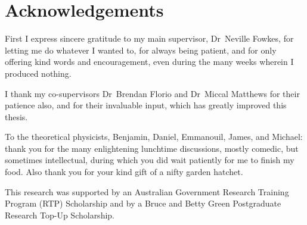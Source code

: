 \chapter{Acknowledgements}
\label{ch:acknowledgements}

First I express sincere gratitude to my main supervisor,
Dr~Neville Fowkes,
for letting me do whatever I wanted to,
for always being patient,
and for only offering kind words and encouragement,
even during the many weeks wherein I produced nothing.

I thank my co-supervisors
Dr~Brendan Florio and Dr~Miccal Matthews
for their patience also,
and for their invaluable input,
which has greatly improved this thesis.

To the theoretical physicists,
Benjamin, Daniel, Emmanouil, James, and Michael:
thank you for the many enlightening lunchtime discussions,
mostly comedic, but sometimes intellectual,
during which you did wait patiently for me to finish my food.
Also thank you for your kind gift of a nifty garden hatchet.

\thematicbreak

This research was supported
by an Australian Government Research Training Program (RTP) Scholarship
and by a Bruce and Betty Green Postgraduate Research Top-Up Scholarship.
